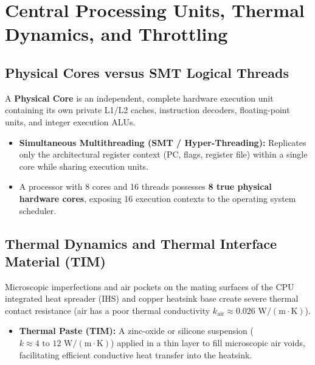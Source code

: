 \section{Central Processing Units, Thermal Dynamics, and Throttling}
\label{sec:cpu_thermals}

\subsection{Physical Cores versus SMT Logical Threads}
A \textbf{Physical Core} is an independent, complete hardware execution unit containing its own private L1/L2 caches, instruction decoders, floating-point units, and integer execution ALUs.
\begin{itemize}
    \item \textbf{Simultaneous Multithreading (SMT / Hyper-Threading):} Replicates only the architectural register context (PC, flags, register file) within a single core while sharing execution units.
    \item A processor with 8 cores and 16 threads possesses \textbf{8 true physical hardware cores}, exposing 16 execution contexts to the operating system scheduler.
\end{itemize}

\subsection{Thermal Dynamics and Thermal Interface Material (TIM)}
Microscopic imperfections and air pockets on the mating surfaces of the CPU integrated heat spreader (IHS) and copper heatsink base create severe thermal contact resistance (air has a poor thermal conductivity $k_{\text{air}} \approx 0.026\text{ W}/(\text{m}\cdot\text{K})$).
\begin{itemize}
    \item \textbf{Thermal Paste (TIM):} A zinc-oxide or silicone suspension ($k \approx 4\text{ to } 12\text{ W}/(\text{m}\cdot\text{K})$) applied in a thin layer to fill microscopic air voids, facilitating efficient conductive heat transfer into the heatsink.
\end{itemize}

